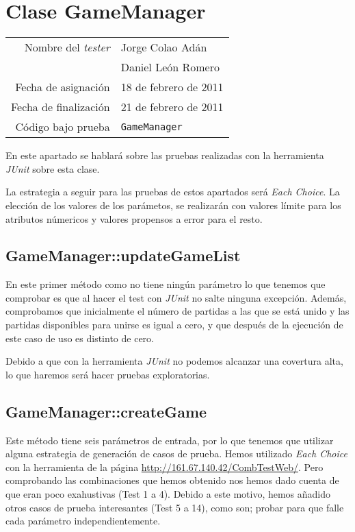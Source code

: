 \section{Clase GameManager}

{\small
\begin{tabular}{r|l}
Nombre del \textit{tester} & Jorge Colao Adán \\
& Daniel León Romero\\
Fecha de asignación & 18 de febrero de 2011 \\
Fecha de finalización & 21 de febrero de 2011 \\
Código bajo prueba & \texttt{GameManager}
\end{tabular}
}

En este apartado se hablará sobre las pruebas realizadas con la herramienta \textit{JUnit} sobre esta clase.

La estrategia a seguir para las pruebas de estos apartados será \textit{Each Choice}. La elección de los valores de los parámetos, se realizarán con valores límite para los atributos númericos y valores propensos a error para el resto.

\subsection{GameManager::updateGameList}

En este primer método como no tiene ningún parámetro lo que tenemos que comprobar es que al hacer el test con \textit{JUnit} no salte ninguna excepción. Además, comprobamos que inicialmente el número de partidas a las que se está unido y las partidas disponibles para unirse es igual a cero, y que después de la ejecución de este caso de uso es distinto de cero.

Debido a que con la herramienta \textit{JUnit} no podemos alcanzar una covertura alta, lo que haremos será hacer pruebas exploratorias.

\subsection{GameManager::createGame}

Este método tiene seis parámetros de entrada, por lo que tenemos que utilizar alguna estrategia de generación de casos de prueba. Hemos utilizado \textit{Each Choice} con la herramienta de la página \url{http://161.67.140.42/CombTestWeb/}. Pero comprobando las combinaciones que hemos obtenido nos hemos dado cuenta de que eran poco exahustivas (Test 1 a 4). Debido a este motivo, hemos añadido otros casos de prueba interesantes (Test 5 a 14), como son; probar para que falle cada parámetro independientemente.

